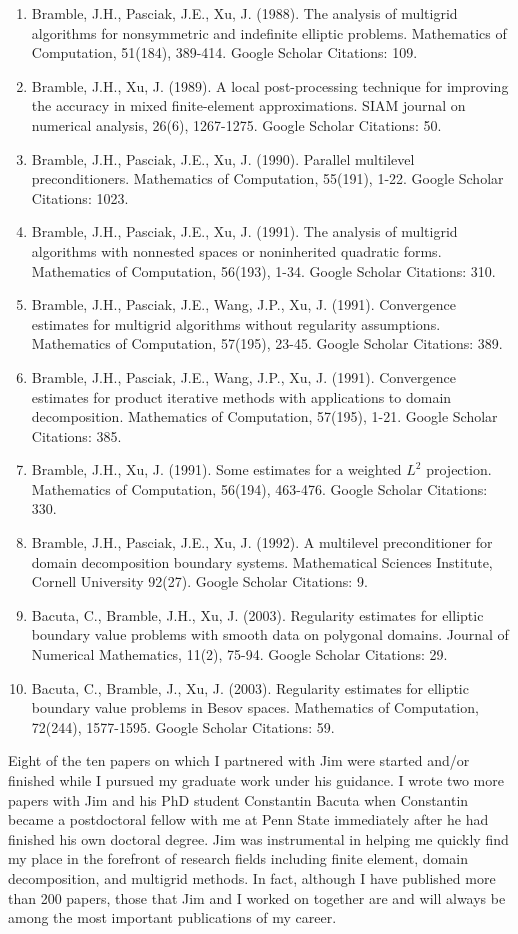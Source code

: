 \documentclass[CJK,11pt]{amsart}
\theoremstyle{definition}
\begin{document}
\begin{CJK*}{UTF8}{gbsn}
\begin{enumerate}
\item	Bramble, J.H., Pasciak, J.E., Xu, J. (1988). The analysis of multigrid algorithms for nonsymmetric and indefinite elliptic problems. Mathematics of Computation, 51(184), 389-414. Google Scholar Citations: 109.
\item	Bramble, J.H., Xu, J. (1989). A local post-processing technique for improving the accuracy in mixed finite-element approximations. SIAM journal on numerical analysis, 26(6), 1267-1275. Google Scholar Citations: 50.
\item	Bramble, J.H., Pasciak, J.E., Xu, J. (1990). Parallel multilevel preconditioners. Mathematics of Computation, 55(191), 1-22. Google Scholar Citations: 1023.
\item	Bramble, J.H., Pasciak, J.E., Xu, J. (1991). The analysis of multigrid algorithms with nonnested spaces or noninherited quadratic forms. Mathematics of Computation, 56(193), 1-34. Google Scholar Citations: 310.
\item	Bramble, J.H., Pasciak, J.E., Wang, J.P., Xu, J. (1991). Convergence estimates for multigrid algorithms without regularity assumptions. Mathematics of Computation, 57(195), 23-45. Google Scholar Citations: 389.
\item	Bramble, J.H., Pasciak, J.E., Wang, J.P., Xu, J. (1991). Convergence estimates for product iterative methods with applications to domain decomposition. Mathematics of Computation, 57(195), 1-21. Google Scholar Citations: 385.
\item	Bramble, J.H., Xu, J. (1991). Some estimates for a weighted $L^2$ projection. Mathematics of Computation, 56(194), 463-476. Google Scholar Citations: 330.
\item Bramble, J.H., Pasciak, J.E., Xu, J. (1992). A multilevel preconditioner for domain decomposition boundary systems. Mathematical Sciences Institute, Cornell University 92(27). Google Scholar Citations: 9.
\item Bacuta, C., Bramble, J.H., Xu, J. (2003). Regularity estimates for elliptic boundary value problems with smooth data on polygonal domains. Journal of Numerical Mathematics, 11(2), 75-94. Google Scholar Citations: 29.
\item Bacuta, C., Bramble, J., Xu, J. (2003). Regularity estimates for elliptic boundary value problems in Besov spaces. Mathematics of Computation, 72(244), 1577-1595. Google Scholar Citations: 59.
\end{enumerate}
Eight of the ten papers on which I partnered with Jim were started and/or finished while I pursued my graduate work under his guidance. I wrote two more papers with Jim and his PhD student Constantin Bacuta when Constantin became a postdoctoral fellow with me at Penn State immediately after he had finished his own doctoral degree. Jim was instrumental in helping me quickly find my place in the forefront of research fields including finite element, domain decomposition, and multigrid methods. In fact, although I have published more than 200 papers, those that Jim and I worked on together are and will always be among the most important publications of my career.

\end{CJK*}
\end{document}

